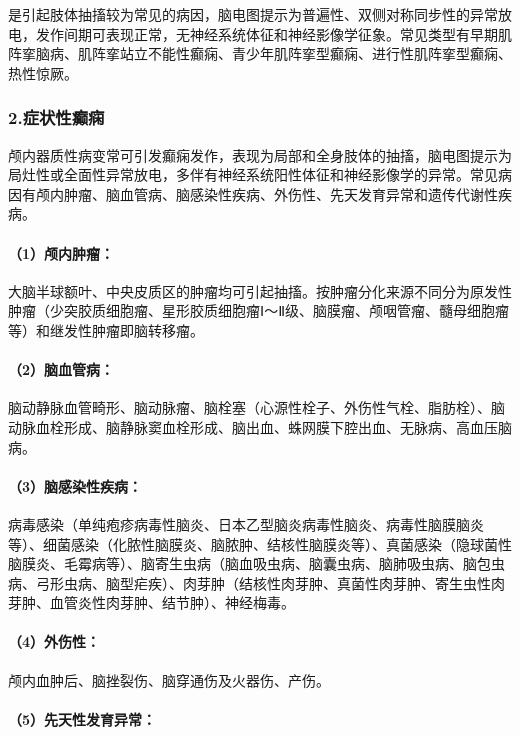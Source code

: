 是引起肢体抽搐较为常见的病因，脑电图提示为普遍性、双侧对称同步性的异常放电，发作间期可表现正常，无神经系统体征和神经影像学征象。常见类型有早期肌阵挛脑病、肌阵挛站立不能性癫痫、青少年肌阵挛型癫痫、进行性肌阵挛型癫痫、热性惊厥。

\subsubsection{2.症状性癫痫}

颅内器质性病变常可引发癫痫发作，表现为局部和全身肢体的抽搐，脑电图提示为局灶性或全面性异常放电，多伴有神经系统阳性体征和神经影像学的异常。常见病因有颅内肿瘤、脑血管病、脑感染性疾病、外伤性、先天发育异常和遗传代谢性疾病。

\paragraph{（1）颅内肿瘤：}

大脑半球额叶、中央皮质区的肿瘤均可引起抽搐。按肿瘤分化来源不同分为原发性肿瘤（少突胶质细胞瘤、星形胶质细胞瘤Ⅰ～Ⅱ级、脑膜瘤、颅咽管瘤、髓母细胞瘤等）和继发性肿瘤即脑转移瘤。

\paragraph{（2）脑血管病：}

脑动静脉血管畸形、脑动脉瘤、脑栓塞（心源性栓子、外伤性气栓、脂肪栓）、脑动脉血栓形成、脑静脉窦血栓形成、脑出血、蛛网膜下腔出血、无脉病、高血压脑病。

\paragraph{（3）脑感染性疾病：}

病毒感染（单纯疱疹病毒性脑炎、日本乙型脑炎病毒性脑炎、病毒性脑膜脑炎等）、细菌感染（化脓性脑膜炎、脑脓肿、结核性脑膜炎等）、真菌感染（隐球菌性脑膜炎、毛霉病等）、脑寄生虫病（脑血吸虫病、脑囊虫病、脑肺吸虫病、脑包虫病、弓形虫病、脑型疟疾）、肉芽肿（结核性肉芽肿、真菌性肉芽肿、寄生虫性肉芽肿、血管炎性肉芽肿、结节肿）、神经梅毒。

\paragraph{（4）外伤性：}

颅内血肿后、脑挫裂伤、脑穿通伤及火器伤、产伤。

\paragraph{（5）先天性发育异常：}

